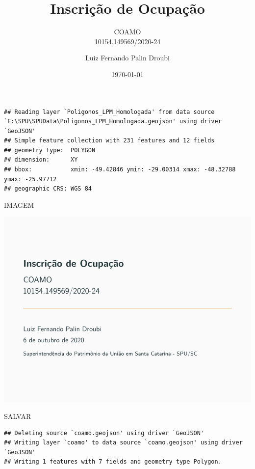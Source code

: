 \documentclass[ignorenonframetext,]{beamer}
\title[]{Inscrição de Ocupação}
\subtitle{COAMO\\
10154.149569/2020-24}
\author[
        Luiz Fernando Palin Droubi
    ]{Luiz Fernando Palin Droubi}
\institute[
    ]{
    Superintendência do Patrimônio da União em Santa Catarina - SPU/SC
    }
\date[
      \today
  ]{
      \today
        }
\begin{document}
  \begin{frame}[plain]
  \titlepage
  \end{frame}



\begin{frame}[fragile]

\begin{verbatim}
## Reading layer `Poligonos_LPM_Homologada' from data source `E:\SPU\SPUData\Poligonos_LPM_Homologada.geojson' using driver `GeoJSON'
## Simple feature collection with 231 features and 12 fields
## geometry type:  POLYGON
## dimension:      XY
## bbox:           xmin: -49.42846 ymin: -29.00314 xmax: -48.32788 ymax: -25.97712
## geographic CRS: WGS 84
\end{verbatim}

\end{frame}

\begin{frame}{IMAGEM}
\protect\hypertarget{imagem}{}

\includegraphics[width=13.78in]{coamo}

\end{frame}

\begin{frame}[fragile]{SALVAR}
\protect\hypertarget{salvar}{}

\begin{verbatim}
## Deleting source `coamo.geojson' using driver `GeoJSON'
## Writing layer `coamo' to data source `coamo.geojson' using driver `GeoJSON'
## Writing 1 features with 7 fields and geometry type Polygon.
\end{verbatim}

\end{frame}
\end{document}
